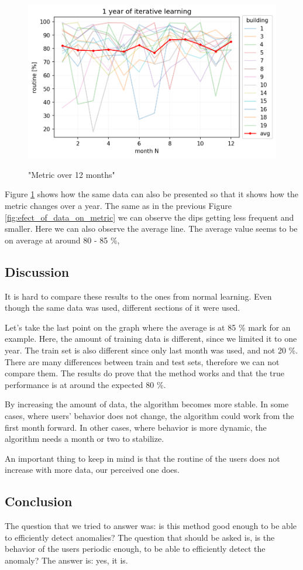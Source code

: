 \begin{figure}[H]
	\centering
	\caption{"Metric over 12 months"}
	\includegraphics[width=.7\textwidth]{Figures/EC/DYN/1_year_of_iterative_learning_avg.png}
	\label{fig:1_year_of_iterative_learning_avg}
\end{figure}

Figure \ref{fig:1_year_of_iterative_learning_avg} shows how the same data can also be presented so that it shows how the metric changes over a year.
The same as in the previous Figure \ref{fig:efect_of_data_on_metric} we can observe the dips getting less frequent and smaller. 
Here we can also observe the average line. 
The average value seems to be on average at around 80 - 85 \%,

\subsection{Discussion}

It is hard to compare these results to the ones from normal learning.
Even though the same data was used, different sections of it were used.

Let's take the last point on the graph where the average is at 85 \% mark for an example.
Here, the amount of training data is different, since we limited it to one year. 
The train set is also different since only last month was used, and not 20 \%. 
There are many differences between train and test sets, therefore we can not compare them.
The results do prove that the method works and that the true performance is at around the expected 80 \%.

By increasing the amount of data, the algorithm becomes more stable.
In some cases, where users' behavior does not change, the algorithm could work
from the first month forward. In other cases, where behavior is more dynamic, 
the algorithm needs a month or two to stabilize. 

An important thing to keep in mind is that the routine of the users does not increase with more data,
our perceived one does. 

\subsection{Conclusion}

The question that we tried to answer was:
is this method good enough to be able to efficiently detect anomalies? 
The question that should be asked is,
is the behavior of the users periodic enough, to 
be able to efficiently detect the anomaly?
The answer is: yes, it is.



